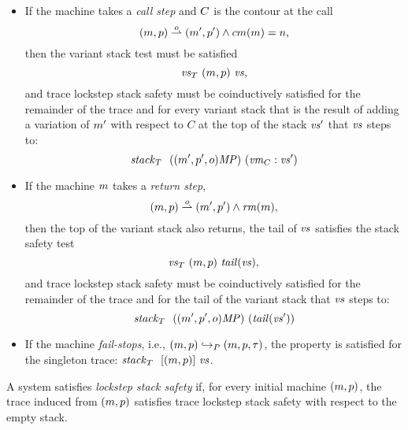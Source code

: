 \documentclass[acmsmall,review,anonymous]{acmart}\settopmatter{printfolios=true,printccs=false,printacmref=false}
\begin{document}
{\begin{itemize}
\item
  If the machine takes a \emph{call step} and $C$ is the contour at
  the call
  \[(m, p) \overset{o}{\rightharpoonup} (m', p') \wedge cm(m) = n,\]
%
  then the variant stack test must be
  satisfied
  \[\mathit{\mathit{vs}}_T ~ (m, p) ~ \mathit{vs},\]
%
%
  and trace lockstep stack safety must be coinductively satisfied
  for the remainder of the trace and for every variant stack
  that is the result of adding a variation of $m'$ with
  respect to $C$ at the top of the stack $\mathit{vs}'$ that $\mathit{vs}$ steps
  to:
  \[\mathit{stack}_T ~  ~ ((m', p', o)\mathit{MP}) ~ (\mathit{vm}_{C} : \mathit{vs}')\]

\item
%
  If the machine $m$ takes a \emph{return step},
  \[(m, p) \overset{o}{\rightharpoonup} (m', p') \wedge \mathit{rm}(m),\]
  then the top of the variant stack also returns,
  the tail of $\mathit{vs}$ satisfies the stack safety test
  \[\mathit{\mathit{vs}}_T ~ (m, p) ~ \mathit{tail}(\mathit{vs}),\]
  and trace lockstep stack safety must be coinductively satisfied for
  the remainder of the trace and for the tail of the variant stack
  that $\mathit{vs}$ steps to:
  \[\mathit{stack}_T ~  ~ ((m', p', o)\mathit{MP}) ~ (\mathit{tail}(\mathit{vs}'))\]

\item If the machine \emph{fail-stops}, i.e., $(m, p) \hookrightarrow_P
    (m, p, \tau)$, the property is satisfied for the singleton trace:
    $\mathit{stack}_T ~  ~ [(m, p)] ~ \mathit{vs}$.


  \end{itemize}

%
A system satisfies {\em lockstep stack safety} if, for every initial machine $(m,p)$,
the trace induced from $(m, p)$ satisfies trace lockstep stack safety with
respect to the empty stack.

}
\end{document}
